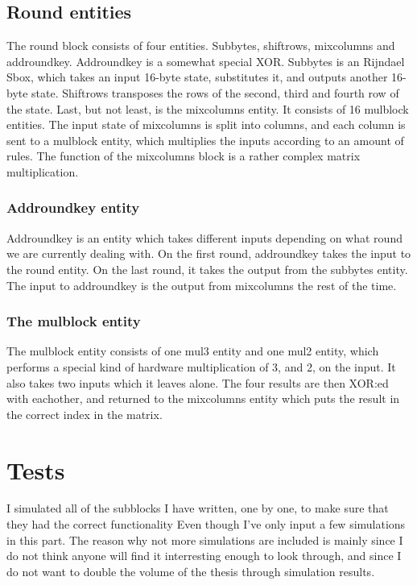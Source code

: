 \subsection{Round entities}
The round block consists of four entities. Subbytes, shiftrows, mixcolumns and 
addroundkey. Addroundkey is a somewhat special XOR. Subbytes is an Rijndael 
Sbox, which takes an input 16-byte state, substitutes it, and outputs another 
16-byte state. Shiftrows transposes the rows of the second, third and fourth 
row of the state. Last, but not least, is the mixcolumns entity. It consists of 
16 mulblock entities. The input state of mixcolumns is split into columns, and 
each column is sent to a mulblock entity, which multiplies the inputs according 
to an amount of rules. The function of the mixcolumns block is a rather complex 
matrix multiplication.

\subsubsection{Addroundkey entity}
Addroundkey is an entity which takes different inputs depending on 
what round we are currently dealing with. On the first round, addroundkey takes 
the input to the round entity. On the last round, it takes the output from the 
subbytes entity. The input to addroundkey is the output from mixcolumns the rest 
of the time.

\subsubsection{The mulblock entity}
The mulblock entity consists of one mul3 entity and one mul2 entity, which 
performs a special kind of hardware multiplication of 3, and 2, on the input. It 
also takes two inputs which it leaves alone. The four results are then XOR:ed 
with eachother, and returned to the mixcolumns entity which puts the result in 
the correct index in the matrix.

\section{Tests}
I simulated all of the subblocks I have written, one by one, to make sure that 
they had the correct functionality Even though I've only input a few simulations 
in this part. The reason why not more simulations are included is mainly since 
I do not think anyone will find it interresting enough to look through, and since
I do not want to double the volume of the thesis through simulation results.

